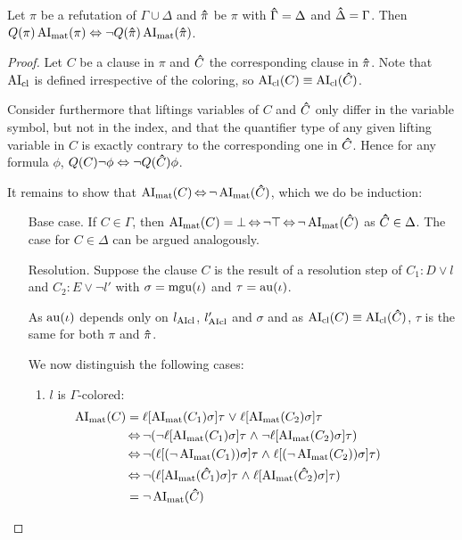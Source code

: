 \documentclass[,%
	draft=false,%
	numbers=noendperiod
	11pt,
	a4paper,
	oneside,%
	openany,
]{memoir}
\begin{document}
\begin{lemma}
	\label{lemma:ai_symmetry}
	Let $\pi$ be a refutation of $\Gamma\cup\Delta$ and $\bm\hat \pi$ be $\pi$ with $\bm\hat \Gamma = \Delta$ and $\bm\hat \Delta = \Gamma$. Then $Q(\pi)\operatorname{AI}_\mathrm{mat}(\pi) \;{\operatorname{\Leftrightarrow}}\; \lnot Q(\bm\hat \pi)\operatorname{AI}_\mathrm{mat}(\bm\hat \pi)$.
\end{lemma}
\begin{proof}
	Let $C$ be a clause in $\pi$ and $\bm\hat C$ the corresponding clause in $\bm\hat \pi$. 
	Note that $\operatorname{AI}_\mathrm{cl}$ is defined irrespective of the coloring, so $\operatorname{AI}_\mathrm{cl}(C) \equiv \operatorname{AI}_\mathrm{cl}(\bm\hat C)$.

	Consider furthermore that liftings variables of $C$ and $\bm\hat C$ only differ in the variable symbol, but not in the index, and that the quantifier type of any given lifting variable in $C$ is exactly contrary to the corresponding one in $\bm\hat C$.
	Hence for any formula $\phi$, $Q(C) \lnot \phi \;{\operatorname{\Leftrightarrow}}\; \lnot Q(\bm\hat C) \phi$.

	It remains to show that $\operatorname{AI}_\mathrm{mat}(C) \operatorname{\Leftrightarrow} \lnot \operatorname{AI}_\mathrm{mat}(\bm\hat C)$, which we do be induction:

	\begin{itemize}
		\item[Base case.]
			If $C \in \Gamma$, then $\operatorname{AI}_\mathrm{mat}(C) = \bot \operatorname{\Leftrightarrow} \lnot \top \operatorname{\Leftrightarrow} \lnot \operatorname{AI}_\mathrm{mat}(\bm\hat C)$ as $\bm\hat C\in\Delta$. 
			The case for $C\in\Delta$ can be argued analogously.

		\item[Resolution.]
			Suppose the clause $C$ is the result of a resolution step \inference{} of $C_1: D \lor l$ and $C_2: E \lor \lnot l'$ with $\sigma = \operatorname{mgu}(\iota)$ and $\tau = \operatorname{au}(\iota)$.

			As $\operatorname{au}(\iota)$ depends only on $l_{\operatorname{AIcl}}$, $l'_{\operatorname{AIcl}}$ and $\sigma$ and as $\operatorname{AI}_\mathrm{cl}(C) \equiv \operatorname{AI}_\mathrm{cl}(\bm\hat C)$, $\tau$ is the same for both $\pi$ and $\bm\hat \pi$.

			We now distinguish the following cases:

			\begin{enumerate}

				\item $l$ is $\Gamma$-colored:
					\begin{align*}
						\hspace*{\dimexpr-\leftmargini-\leftmarginii}
						\AImat(C)	&= \lifboth{\AImat(C_1)\sigma}\tau\spas\lor \lifboth{\AImat(C_2)\sigma}\tau \\
															 &\semiff \lnot (\lnot\lifboth{\AImat(C_1)\sigma}\tau\spas\land \lnot \lifboth{\AImat(C_2)\sigma}\tau) \\
															 &\semiff \lnot (\lifboth{(\lnot \AImat(C_1))\sigma}\tau\spas\land \lifboth{(\lnot \AImat(C_2))\sigma}\tau) \\
															 &\semiff \lnot (\lifboth{\AImat(\bhat C_1)\sigma}\tau\spas\land \lifboth{\AImat(\bhat C_2)\sigma}\tau) \\
															 &= \lnot \AImat(\bhat C)
					\end{align*}


\end{enumerate}
\end{itemize}
\end{proof}
\end{document}

